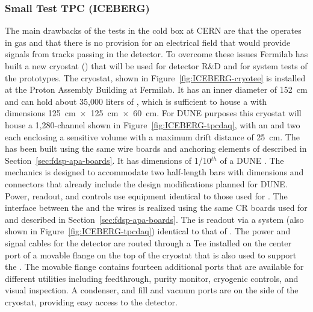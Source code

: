 \subsubsection{Small Test TPC (ICEBERG)}
\label{sec:fdsp-tpcelec-qa-facilities-testtpc}

The main drawbacks of the tests in the cold box at CERN are that the 
operates in gas and that there is no provision for an electrical field that 
would provide signals from tracks passing in the detector. To overcome these 
issues Fermilab has built a new cryostat () that will be used for 
 detector R\&D and for system tests of the  prototypes. 
The  cryostat, shown in Figure~\ref{fig:ICEBERG-cryotee} is installed
at the Proton Assembly Building at Fermilab. It has an inner diameter of \SI{152}{cm}
and can hold about 35,000 liters of , which is sufficient to house a
 with dimensions \SI{125}{cm}~$\times$~\SI{125}{cm}~$\times$~\SI{60}{cm}. For DUNE 
purposes this cryostat will house a 1,280-channel  shown in
Figure~\ref{fig:ICEBERG-tpcdaq}, with an  and two  each 
enclosing a sensitive volume with a maximum drift distance of \SI{25}{cm}. The  
has been built using the same wire boards and anchoring elements of   
described in Section~\ref{sec:fdsp-apa-boards}. It has dimensions of 
1/10$^{th}$ of a DUNE . The  mechanics is designed to accommodate 
two half-length  bars with dimensions and connectors that already 
include the design modifications planned for DUNE. Power, readout, and controls 
use equipment identical to those used for . The interface between the 
 and the  wires is realized using the same CR boards used 
for  and described in Section~\ref{sec:fdsp-apa-boards}. The  is
readout via a  system (also shown in Figure~\ref{fig:ICEBERG-tpcdaq})
identical to that of . The power and signal cables for the detector 
are routed through a Tee installed on the center port of a movable flange on the 
top of the cryostat that is also used to support the . The movable 
flange contains fourteen additional ports that are available for different utilities 
including  feedthrough, purity monitor, cryogenic controls, and visual inspection. 
A condenser, and  fill and vacuum ports are on the side of the cryostat, 
providing easy access to the detector.

